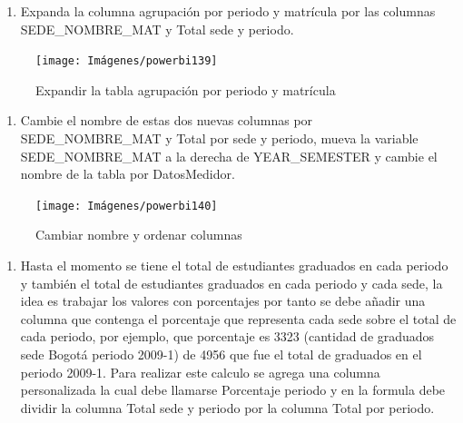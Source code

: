 \documentclass[
]{book}
\providecommand{\tightlist}{%
  \setlength{\itemsep}{0pt}\setlength{\parskip}{0pt}}
\begin{document}
\begin{enumerate}
\def\labelenumi{\arabic{enumi}.}
\setcounter{enumi}{6}
\tightlist
\item
  Expanda la columna agrupación por periodo y matrícula por las columnas SEDE\_NOMBRE\_MAT y Total sede y periodo.
\end{enumerate}

\begin{figure}

{\centering \texttt{[image: Imágenes/powerbi139]} 

}

\caption{Expandir la tabla agrupación por periodo y matrícula}\label{fig:expandiragrupacionperiodoymatricla-fig}
\end{figure}

\begin{enumerate}
\def\labelenumi{\arabic{enumi}.}
\setcounter{enumi}{7}
\tightlist
\item
  Cambie el nombre de estas dos nuevas columnas por SEDE\_NOMBRE\_MAT y Total por sede y periodo, mueva la variable SEDE\_NOMBRE\_MAT a la derecha de YEAR\_SEMESTER y cambie el nombre de la tabla por DatosMedidor.
\end{enumerate}

\begin{figure}

{\centering \texttt{[image: Imágenes/powerbi140]} 

}

\caption{Cambiar nombre y ordenar columnas}\label{fig:cambiarnombreyordenarcolumnas-fig}
\end{figure}

\begin{enumerate}
\def\labelenumi{\arabic{enumi}.}
\setcounter{enumi}{8}
\tightlist
\item
  Hasta el momento se tiene el total de estudiantes graduados en cada periodo y también el total de estudiantes graduados en cada periodo y cada sede, la idea es trabajar los valores con porcentajes por tanto se debe añadir una columna que contenga el porcentaje que representa cada sede sobre el total de cada periodo, por ejemplo, que porcentaje es 3323 (cantidad de graduados sede Bogotá periodo 2009-1) de 4956 que fue el total de graduados en el periodo 2009-1. Para realizar este calculo se agrega una columna personalizada la cual debe llamarse Porcentaje periodo y en la formula debe dividir la columna Total sede y periodo por la columna Total por periodo.
\end{enumerate}
\end{document}
